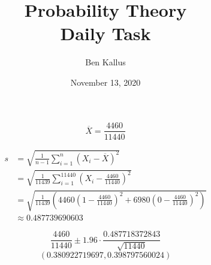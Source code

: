 \documentclass[12pt]{article}
\title{Probability Theory \\ Daily Task}
\author{Ben Kallus}
\date{November 13, 2020}
\begin{document}
\color{white}
\pagecolor{black}
\maketitle

 \[\overline{X} = \frac{4460}{11440}\]

\begin{align*}
    s &= \sqrt{\frac1{n-1}\sum\limits_{i=1}^n (X_i - \overline X)^2} \\
      &= \sqrt{\frac1{11439}\sum\limits_{i=1}^{11440} \left(X_i - \frac{4460}{11440}\right)^2} \\
      &= \sqrt{\frac1{11439}\left(4460\left(1 - \frac{4460}{11440}\right)^2 + 6980\left(0 - \frac{4460}{11440}\right)^2\right)} \\
      &\approx 0.487739690603
\end{align*}

 $$\frac{4460}{11440} \pm 1.96 \cdot \frac{0.487718372843}{\sqrt{11440}}$$
                  $$(0.380922719697, 0.398797560024)$$
   
 
\end{document}
